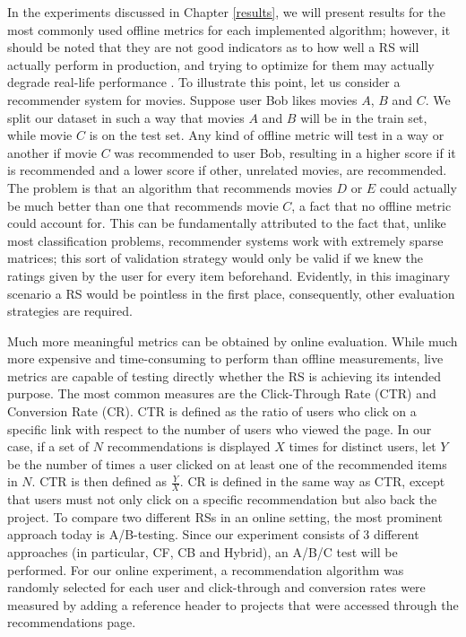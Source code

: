 \documentclass[cic,tc,english]{iiufrgs}
\newcommand{\adriano}[1]{#1}
\begin{document}
In the experiments discussed in Chapter \ref{results}, we will present results for the most commonly used offline metrics for each implemented algorithm; however, it should be noted that they are not good indicators as to how well a RS will actually perform in production, and trying to optimize for them may actually degrade real-life performance \cite{McNee2006}. To illustrate this point, let us consider a recommender system for movies. Suppose user Bob likes movies $A$, $B$ and $C$. We split our dataset in such a way that movies $A$ and $B$ will be in the train set, while movie $C$ is on the test set. Any kind of offline metric will test in a way or another if movie $C$ was recommended to user Bob, resulting in a higher score if it is recommended and a lower score if other, unrelated movies, are recommended. The problem is that an algorithm that recommends movies $D$ or $E$ could actually be much better than one that recommends movie $C$, a fact that no offline metric could account for. This can be fundamentally attributed to the fact that, unlike most classification problems, recommender systems work with extremely sparse matrices; this sort of validation strategy would only be valid if we knew the ratings given by the user for every item beforehand. Evidently, in this imaginary scenario a RS would be pointless in the first place, consequently, other evaluation strategies are required.

Much more meaningful metrics can be obtained by online evaluation. While much more expensive and time-consuming to perform than offline measurements, live metrics are capable of testing directly whether the RS is achieving its intended purpose. The most common measures are the Click-Through Rate (CTR) and Conversion Rate (CR). CTR is defined as the ratio of users who click on a specific link with respect to the number of users who viewed the page. In our case, if a set of $N$ recommendations is displayed $X$ times for distinct users, let $Y$ be the number of times a user clicked on at least one of the recommended items in $N$. CTR is then defined as $\frac{Y}{X}$. CR is defined in the same way as CTR, except that users must not only click on a specific recommendation but also back the project. To compare two different RSs in an online setting, the most prominent approach today is A/B-testing. Since our experiment consists of 3 different approaches \adriano{(in particular, CF, CB and Hybrid)}, an A/B/C test will be performed. For our online experiment, a recommendation algorithm was randomly selected for each user and click-through and conversion rates were measured by adding a reference header to projects that were accessed through the recommendations page.
\end{document}
